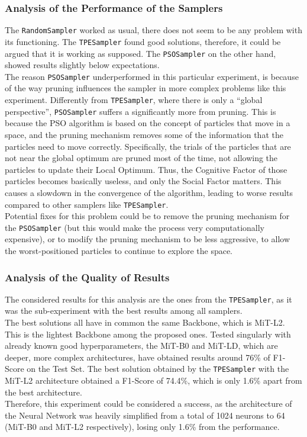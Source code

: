 \subsubsection{Analysis of the Performance of the Samplers}

The \texttt{RandomSampler} worked as usual, there does not seem to be any problem with its functioning. The \texttt{TPESampler} found good solutions, therefore, it could be argued that it is working as supposed. The \texttt{PSOSampler} on the other hand, showed results slightly below expectations.
\\[0.3cm]The reason \texttt{PSOSampler} underperformed in this particular experiment, is because of the way pruning influences the sampler in more complex problems like this experiment.
Differently from \texttt{TPESampler}, where there is only a “global perspective”, \texttt{PSOSampler} suffers a significantly more from pruning.
This is because the PSO algorithm is based on the concept of particles that move in a space, and the pruning mechanism removes some of the information that the particles need to move correctly.
Specifically, the trials of the particles that are not near the global optimum are pruned most of the time, not allowing the particles to update their Local Optimum. Thus, the Cognitive Factor of those particles becomes basically useless, and only the Social Factor matters. This causes a slowdown in the convergence of the algorithm, leading to worse results compared to other samplers like \texttt{TPESampler}.
\\[0.3cm]Potential fixes for this problem could be to remove the pruning mechanism for the \texttt{PSOSampler} (but this would make the process very computationally expensive), or to modify the pruning mechanism to be less aggressive, to allow the worst-positioned particles to continue to explore the space.  

\subsubsection{Analysis of the Quality of Results}

The considered results for this analysis are the ones from the \texttt{TPESampler}, as it was the sub-experiment with the best results among all samplers.
\\[0.3cm]The best solutions all have in common the same Backbone, which is MiT-L2. This is the lightest Backbone among the proposed ones.
Tested singularly with already known good hyperparameters, the MiT-B0 and MiT-LD, which are deeper, more complex architectures, have obtained results around 76\% of F1-Score on the Test Set.
The best solution obtained by the \texttt{TPESampler} with the MiT-L2 architecture obtained a F1-Score of 74.4\%, which is only 1.6\% apart from the best architecture.
\\[0.3cm]Therefore, this experiment could be considered a success, as the architecture of the Neural Network was heavily simplified from a total of 1024 neurons to 64 (MiT-B0 and MiT-L2 respectively), losing only 1.6\% from the performance.




